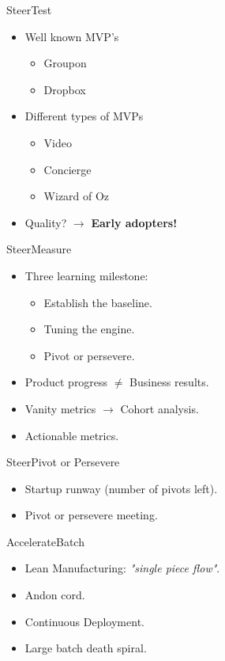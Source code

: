 \documentclass[aspectratio=169]{beamer}
\begin{document}
\begin{frame}{Steer}{Test}
  \begin{itemize}
    \item Well known MVP's
      \begin{itemize}
        \item Groupon
        \item Dropbox
      \end{itemize}
    \item Different types of MVPs
      \begin{itemize}

        \item Video
        \item Concierge
        \item Wizard of Oz
      \end{itemize}
    \item Quality? $\rightarrow$ \textbf{Early adopters!}
  \end{itemize}
\end{frame}

\begin{frame}{Steer}{Measure}
  \begin{itemize}
    \item Three learning milestone:
      \begin{itemize}
        \item Establish the baseline.
        \item Tuning the engine.
        \item Pivot or persevere.
      \end{itemize}

    \item Product progress $\neq$ Business results.
    \item Vanity metrics $\rightarrow$ Cohort analysis.
    \item Actionable metrics.
  \end{itemize}
\end{frame}

\begin{frame}{Steer}{Pivot or Persevere}
  \begin{itemize}
    \item Startup runway (number of pivots left).
    \item Pivot or persevere meeting.
  \end{itemize}
\end{frame}

\begin{frame}{Accelerate}{Batch}
  \begin{itemize}
    \item Lean Manufacturing: \textit{"single piece flow"}.
    \item Andon cord.
    \item Continuous Deployment.
    \item Large batch death spiral.
  \end{itemize}
\end{frame}
\end{document}
